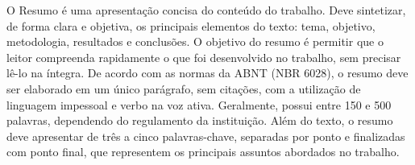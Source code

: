 O Resumo é uma apresentação concisa do conteúdo do trabalho. Deve sintetizar, de forma clara e objetiva, os principais elementos do texto: tema, objetivo, metodologia, resultados e conclusões. O objetivo do resumo é permitir que o leitor compreenda rapidamente o que foi desenvolvido no trabalho, sem precisar lê-lo na íntegra. De acordo com as normas da ABNT (NBR 6028), o resumo deve ser elaborado em um único parágrafo, sem citações, com a utilização de linguagem impessoal e verbo na voz ativa. Geralmente, possui entre 150 e 500 palavras, dependendo do regulamento da instituição. Além do texto, o resumo deve apresentar de três a cinco palavras-chave, separadas por ponto e finalizadas com ponto final, que representem os principais assuntos abordados no trabalho.